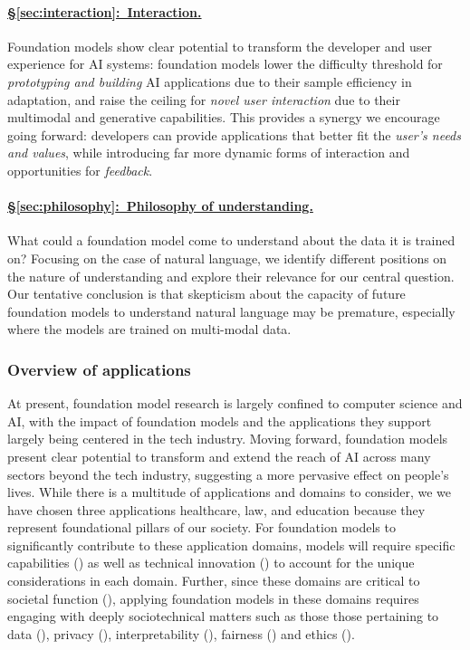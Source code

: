 \paragraph{\hyperref[sec:interaction]{§\ref{sec:interaction}:~Interaction.}}
Foundation models show clear potential to transform the developer and user experience for AI systems: foundation models lower the difficulty threshold for \textit{prototyping and building} AI applications due to their sample efficiency in adaptation, and raise the ceiling for \textit{novel user interaction} due to their multimodal and generative capabilities.
This provides a synergy we encourage going forward: developers can provide applications that better fit the \textit{user's needs and values}, while introducing far more dynamic forms of interaction and opportunities for \textit{feedback}.

\paragraph{\hyperref[sec:philosophy]{§\ref{sec:philosophy}:~Philosophy of understanding.}}

What could a foundation model come to understand about the data it is trained on? Focusing on the case of natural language, we identify different positions on the nature of understanding and explore their relevance for our central question. Our tentative conclusion is that skepticism about the capacity of future foundation models to understand natural language may be premature, especially where the models are trained on multi-modal data.

\subsubsection{Overview of applications}
At present, foundation model research is largely confined to computer science and AI, with the impact of foundation models and the applications they support largely being centered in the tech industry.
Moving forward, foundation models present clear potential to transform and extend the reach of AI across many sectors beyond the tech industry, suggesting a more pervasive effect on people's lives.
While there is a multitude of applications and domains to consider, we we have chosen three applications \dash{} healthcare, law, and education \dash{} because they represent foundational pillars of our society.  
For foundation models to significantly contribute to these application domains, models will require specific capabilities () as well as technical innovation () to account for the unique considerations in each domain.
Further, since these domains are critical to societal function (), applying foundation models in these domains requires engaging with deeply sociotechnical matters such as those those pertaining to data (), privacy (), interpretability (),  fairness () and ethics ().


